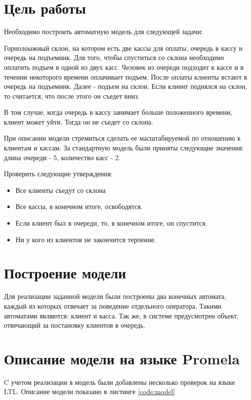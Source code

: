 







\section{Цель работы}
Необходимо построить автоматную модель для следующей задачи:

Горнолоыжный склон, на котором есть две кассы для оплаты, очередь в кассу и очередь на подъемник. Для того, чтобы спуститься со склона необходимо оплатить подъем в одной из двух касс. Человек из очереди подходит к кассе и в течении некоторого времени оплачивает подъем. После оплаты клиенты встают в очередь на подъемник. Далее - подъем на склон. Если клиент поднялся на склон, то считается, что после этого он съедет вниз.

В том случае, когда очередь в кассу занимает больше положенного времени, клиент может уйти. Тогда он не съедет со склона. 

При описании модели стремиться сделать ее масштабируемой по отношению к клиентам и кассам. За стандартную модель были приняты следующие значения: длина очереди - 5, количество касс - 2. 

Проверить следующие утверждения:
\begin{itemize}
\item Все клиенты съедут со склона
\item Все кассы, в конечном итоге, освободятся.
\item Если клиент был в очереди, то, в конечном итоге, он спустится.
\item Ни у кого из клиентов не закончится терпение.
\end{itemize}

\section{Построение модели}
Для реализации заданной модели были построены два конечных автомата, каждый из которых отвечает за поведение отдельного оператора. Такими автоматами являются: клиент и касса. Так же, в системе предусмотрен объект, отвечающий за постановку клиентов в очередь. 


\section{Описание модели на языке Promela}
C учетом реализации в модель были добавлены несколько проверок на языке LTL. Описание модели показано в листинге \ref{code:model}


